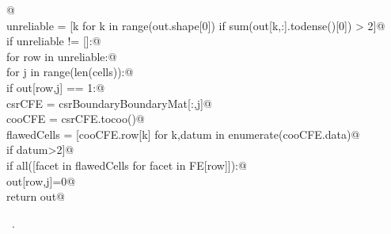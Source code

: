 \documentclass[11pt,oneside]{article}    %
\begin{document}
\begin{flushleft}
\begin{list}{}{}
\mbox{}\verb@    @\\
\mbox{}\verb@    unreliable = [k for k in range(out.shape[0]) if sum(out[k,:].todense()[0]) > 2]@\\
\mbox{}\verb@    if unreliable != []:@\\
\mbox{}\verb@        for row in unreliable:@\\
\mbox{}\verb@            for j in range(len(cells)):@\\
\mbox{}\verb@                if out[row,j] == 1:@\\
\mbox{}\verb@                    csrCFE = csrBoundaryBoundaryMat[:,j]@\\
\mbox{}\verb@                    cooCFE = csrCFE.tocoo()@\\
\mbox{}\verb@                    flawedCells = [cooCFE.row[k] for k,datum in enumerate(cooCFE.data)@\\
\mbox{}\verb@                        if datum>2]@\\
\mbox{}\verb@                    if all([facet in flawedCells  for facet in FE[row]]):@\\
\mbox{}\verb@                        out[row,j]=0@\\
\mbox{}\verb@    return out@\\
\mbox{}\verb@@{\NWsep}
\end{list}
\vspace{-1ex}
\footnotesize\addtolength{\baselineskip}{-1ex}
\begin{list}{}{\setlength{\itemsep}{-\parsep}\setlength{\itemindent}{-\leftmargin}}
\item \NWtxtMacroRefIn\ .
\end{list}
\end{flushleft}
\end{document}
